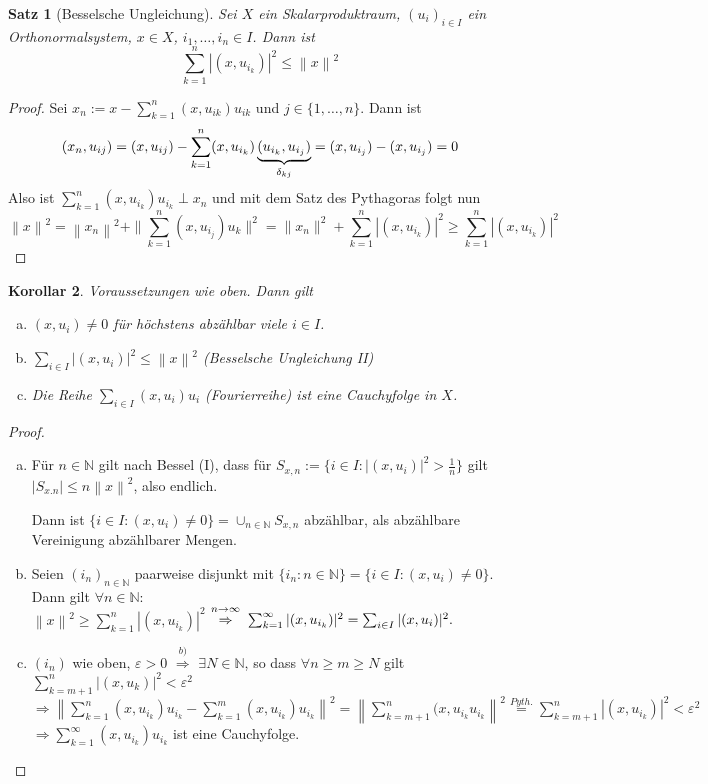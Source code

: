 \documentclass[ngerman]{report}
\theoremstyle{plain}%
\newtheorem{thm}{Satz}[chapter]
\newtheorem{cor}[thm]{Korollar}
\theoremstyle{definition}%
\theoremstyle{myStyle}
\newcommand{\N}{\mathbb{N}}
\newcommand{\norm}[1]{\left \|#1\right\| }
\newcommand{\df}[1][]{%
	\overset{#1}{\Rightarrow}
}
\newcommand{\disp}{\displaystyle}
\newcommand{\ff}[3]{(#1_#2)_{#2\in#3}}
\newcommand{\spcm}[1][-0.8]{\vspace{#1 em}} %
\begin{document}
	\begin{thm}[Besselsche Ungleichung]
		Sei $X$ ein Skalarproduktraum, $\ff{u}{i}{I}$ ein Orthonormalsystem, $x\in X$, $i_1,\dots,i_n \in I$. Dann ist 
			$$\sum_{k=1}^n |(x,u_{i_k})|^2 \leq\norm{x}^2 $$
	\end{thm}
	\begin{proof}
		Sei $\disp x_n := x - \sum_{k=1}^n (x,u_{ik}) u_{ik}$ und $j\in \{1,\dots,n\}$. Dann ist
		\spcm[-1]
		$$(x_n, u_{ij}) = (x,u_{ij}) - \sum^n_{k=1} (x,u_{i_k}) \underbrace{(u_{i_k},u_{i_j})}_{\delta_{kj}}
		= (x, u_{i_j}) - (x, u_{i_j}) = 0 \spcm$$
		Also ist $\sum^n_{k=1} (x, u_{i_k}) u_{i_k} \perp x_n$
		und mit dem Satz des Pythagoras folgt nun
		\spcm[-0.5]
		$$\norm{x}^2 = \norm{x_n}^2+\|\sum^n_{k=1} (x,u_{i_j})u_k\|^2 = \|x_n\|^2 + \sum^n_{k=1}|(x,u_{i_k})|^2 \geq \sum^n_{k=1} |(x,u_{i_k})|^2$$
	\end{proof}
	
	\begin{cor}
		Voraussetzungen wie oben. Dann gilt\par
		\begin{enumerate}[(a)]
			\item $(x, u_i) \neq 0$ für höchstens abzählbar viele $i\in I$.
			\item $\sum_{i\in I} |(x, u_i)|^2 \leq \norm{x}^2$ (Besselsche Ungleichung II)
			\item Die Reihe $\sum_{i\in I} (x,u_i)u_i$ (Fourierreihe) ist eine Cauchyfolge in $X$.
		\end{enumerate}
	\end{cor}

	\begin{proof}
		\begin{enumerate}[(a)]
			\item Für $n\in\N$ gilt nach Bessel (I), dass für $S_{x,n} := \{ i\in I: |(x, u_i)| ^2 > \frac{1}{n} \}$ 
			gilt $|S_{x.n}| \leq n \norm{x}^2$, also endlich. \par
			Dann ist $\{i \in I: (x,u_i) \neq 0\} = \cup_{n\in\N} S_{x,n}$ abzählbar, als abzählbare Vereinigung abzählbarer Mengen.
			\item Seien $\ff{i}{n}{\N}$ paarweise disjunkt mit $\{i_n : n\in \N\} = \{i\in I: (x,u_i) \neq 0\}$.
			Dann gilt $\forall n\in \N:$\\
			$\norm{x}^2 \geq \sum_{k=1}^n |(x,u_{i_k})|^2$
			$\overset{n\to \infty}{\df}\; \sum_{k=1}^\infty |(x,u_{i_k})|^2 = \sum_{i\in I} |(x,u_i)|^2.$
			\item $(i_n)$ wie oben, $\varepsilon > 0$ 
			$\df[b)]$ $\exists N\in\N$, so dass $\forall n\geq m \geq N$ gilt 
			$\sum_{k = m+1}^n |(x,u_k)|^2 < \varepsilon^2$\\
			$\df \norm{\sum^n_{k=1} (x,u_{i_k})u_{i_k} - \sum^m_{k=1} (x,u_{i_k}) u_{i_k}}^2
			= \norm{ \sum_{k= m+1} ^ n (x, u_{i_k} u_{i_k}}^2 \overset{Pyth.}{=} \sum_{k=m+1}^n |(x,u_{i_k})|^2 < \varepsilon^2$\\
			$\df \sum^\infty_{k=1} (x,u_{i_k})u_{i_k} $ ist eine Cauchyfolge.
		\end{enumerate}
	\end{proof}
\end{document}
